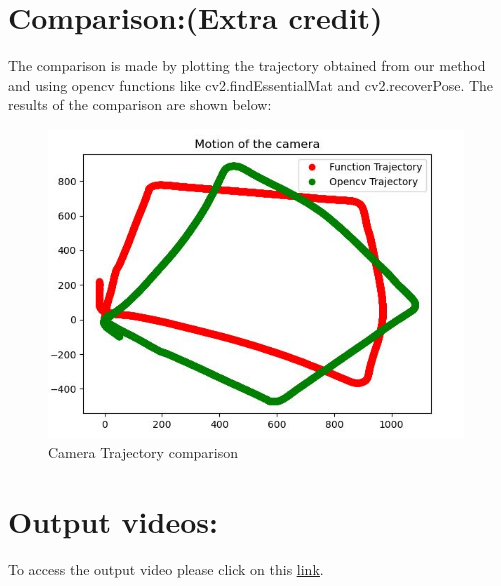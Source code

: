 \documentclass[12pt]{article}
\begin{document}
\section{Comparison:(Extra credit)}
The comparison is made by plotting the trajectory obtained from our method and using opencv functions like cv2.findEssentialMat and cv2.recoverPose. The results of the comparison are shown below:
\begin{figure}[h]
    \centering
    \includegraphics[width=11cm]{output2}
    \caption{Camera Trajectory comparison}
    \label{fig:Camera Trajectory comparison}
\end{figure}

\section{Output videos:}
To access the output video please click on this \href{https://drive.google.com/drive/folders/1bHtRRyyHCVfVULQ9rLM1Tsxr-f1liSLU?usp=sharing}{\underline{link}}.
\end{document}
